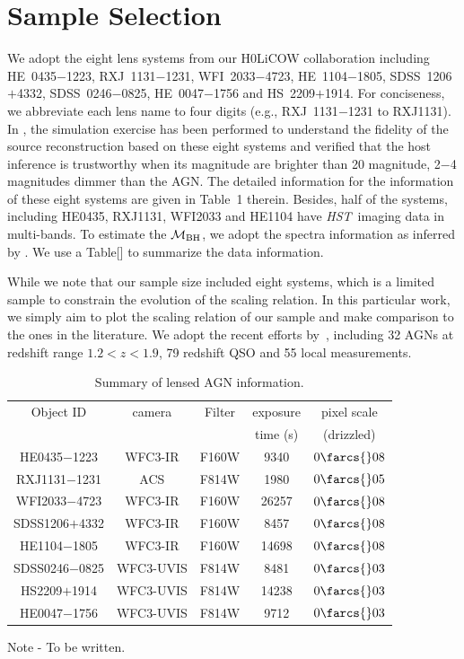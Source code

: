 \documentclass[fleqn,usenatbib]{mnras}
\newcommand{\hst}{{\it HST}}
\newcommand{\mbh}{$\mathcal M_{\rm BH}$}
\begin{document}
\section{Sample Selection}
We adopt the eight lens systems from our H0LiCOW collaboration including HE~0435$-$1223, RXJ~1131$-$1231, WFI~2033$-$4723, HE~1104$-$1805, SDSS~1206$+$4332, SDSS~0246$-$0825, HE~0047$-$1756 and HS~2209$+$1914. For conciseness, we abbreviate each lens name to four digits (e.g., RXJ~1131$-$1231 to RXJ1131). In \citet{Ding2017a}, the simulation exercise has been performed to understand the fidelity of the source reconstruction based on these eight systems and verified that the host inference is trustworthy when its magnitude are brighter than 20 magnitude, 2$-$4 magnitudes dimmer than the AGN. The detailed information for the information of these eight systems are given in Table~1 therein. Besides, half of the systems, including HE0435, RXJ1131, WFI2033 and HE1104 have \hst\ imaging data in multi-bands. To estimate the \mbh, we adopt the spectra information as inferred by \citet{Sluse2012, Peng2006, Shen2011}. We use a Table[] to summarize the data information. 

While we note that our sample size included eight systems, which is a limited sample to constrain the evolution of the scaling relation. In this particular work, we simply aim to plot the scaling relation of our sample and make comparison to the ones in the literature. %
We adopt the recent efforts by~\citet{Ding2020}, including 32 AGNs at redshift range $1.2<z<1.9$, 79 redshift QSO and 55 local measurements.

\begin{table}
\centering
\caption{Summary of lensed AGN information.}\label{data_set}
     \begin{tabular}{ccccc}
        \hline
Object ID & camera & Filter & exposure & pixel scale \\
 & & & time (s) & (drizzled) \\ \hline
HE0435$-$1223 & WFC3-IR & F160W & 9340 & $0\farcs{}08$ \\
RXJ1131$-$1231 & ACS & F814W & 1980 & $0\farcs{}05$ \\
WFI2033$-$4723 & WFC3-IR & F160W & 26257 & $0\farcs{}08$ \\
SDSS1206$+$4332 & WFC3-IR & F160W & 8457 & $0\farcs{}08$ \\
HE1104$-$1805 & WFC3-IR & F160W & 14698 & $0\farcs{}08$ \\
SDSS0246$-$0825 & WFC3-UVIS & F814W & 8481 & $0\farcs{}03$ \\
HS2209$+$1914 & WFC3-UVIS & F814W & 14238 & $0\farcs{}03$ \\
HE0047$-$1756 & WFC3-UVIS & F814W & 9712 & $0\farcs{}03$ \\
        \hline
     \end{tabular}
    \begin{tablenotes}
      \small
      \item Note - To be written.
    \end{tablenotes} 
\end{table}
\end{document}
